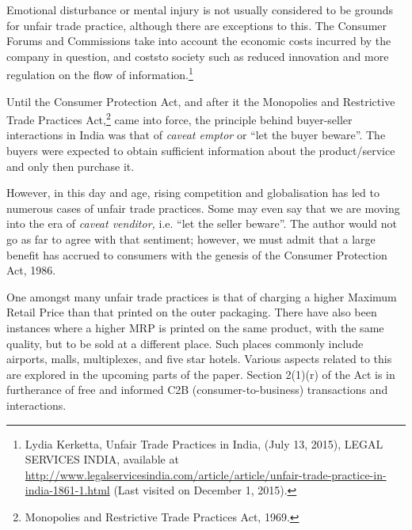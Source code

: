 \begin{multicols}{2}
\vspace{-.15cm}

\noi
Emotional disturbance or mental injury is not usually considered to be grounds for unfair trade
practice, although there are exceptions to this. The Consumer Forums and Commissions take
into account the economic costs incurred by the company in question, and coststo society such
as reduced innovation and more regulation on the flow of information.\footnote{Lydia Kerketta, Unfair Trade Practices in India, (July 13, 2015), LEGAL SERVICES INDIA, available at  \url{http://www.legalservicesindia.com/article/article/unfair-trade-practice-in-india-1861-1.html} (Last visited on
December 1, 2015).}

\vspace{-.15cm}

\noi
Until the Consumer Protection Act, and after it the Monopolies and Restrictive Trade Practices Act,\footnote{Monopolies and Restrictive Trade Practices Act, 1969.} came into force, the principle behind buyer-seller interactions in India was that of \textit{caveat emptor} or “let the buyer beware”. The buyers were expected to obtain sufficient information about the product/service and only then purchase it.

\vspace{-.15cm}

\noi
However, in this day and age, rising competition and globalisation has led to numerous cases
of unfair trade practices. Some may even say that we are moving into the era of \textit{caveat venditor,}
i.e. “let the seller beware”. The author would not go as far to agree with that sentiment;
however, we must admit that a large benefit has accrued to consumers with the genesis of the
Consumer Protection Act, 1986.

\vspace{-.15cm}

\noi
One amongst many unfair trade practices is that of charging a higher Maximum Retail Price
than that printed on the outer packaging. There have also been instances where a higher MRP
is printed on the same product, with the same quality, but to be sold at a different place. Such
places commonly include airports, malls, multiplexes, and five star hotels. Various aspects related to this are explored in the upcoming parts of the paper. Section 2(1)(r) of the Act is in
furtherance of free and informed C2B (consumer-to-business) transactions and interactions.

\vspace{-.1cm}


\end{multicols}
